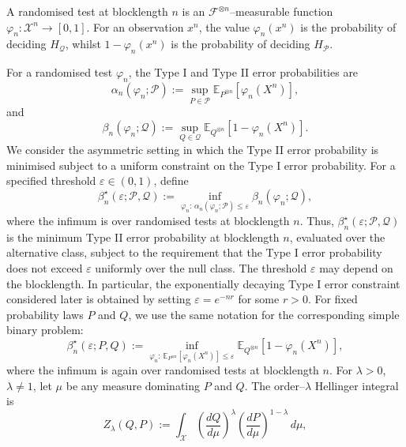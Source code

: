 \documentclass[journal,12pt,draftclsnofoot,onecolumn]{IEEEtran}
\begin{document}
A randomised test at blocklength $n$ is an $\mathcal F^{\otimes n}$--measurable function $\varphi_n:\mathcal X^n\to[0,1]$. For an observation $x^n$, the value $\varphi_n(x^n)$ is the probability of deciding $H_{\mathcal Q}$, whilst $1-\varphi_n(x^n)$ is the probability of deciding $H_{\mathcal P}$.

For a randomised test $\varphi_n$, the Type I and Type II error probabilities are
\begin{equation*}
\alpha_n(\varphi_n;\mathcal P):=\sup_{P\in\mathcal P}\mathbb E_{P^{\otimes n}}\left[\varphi_n(X^n)\right],
\end{equation*}
and
\begin{equation*}
\beta_n(\varphi_n;\mathcal Q):=\sup_{Q\in\mathcal Q}
\mathbb E_{Q^{\otimes n}}\left[1-\varphi_n(X^n)\right].
\end{equation*}
We consider the asymmetric setting in which the Type II error probability is minimised subject to a uniform constraint on the Type I error probability. For a specified threshold $\varepsilon\in(0,1)$, define
\begin{equation}
\beta_n^\star(\varepsilon;\mathcal P,\mathcal Q):=\inf_{\varphi_n:\,\alpha_n(\varphi_n;\mathcal P)\leq\varepsilon} \beta_n(\varphi_n;\mathcal Q),
\label{eq:composite-minimax}
\end{equation}
where the infimum is over randomised tests at blocklength $n$. Thus, $\beta_n^\star(\varepsilon;\mathcal P,\mathcal Q)$ is the minimum Type II error probability at blocklength $n$, evaluated over the alternative class, subject to the requirement that the Type I error probability does not exceed $\varepsilon$ uniformly over the null class. The threshold $\varepsilon$ may depend on the blocklength. In particular, the exponentially decaying Type I error constraint considered later is obtained by setting $\varepsilon=e^{-nr}$ for some $r>0$. For fixed probability laws $P$ and $Q$, we use the same notation for the corresponding simple binary problem:
\begin{equation*}
\beta_n^\star(\varepsilon;P,Q) := \inf_{\varphi_n:\, \mathbb E_{P^{\otimes n}}[\varphi_n(X^n)]\leq\varepsilon} \mathbb E_{Q^{\otimes n}}\left[1-\varphi_n(X^n)\right],
\end{equation*}
where the infimum is again over randomised tests at blocklength $n$. For $\lambda>0$, $\lambda\neq1$, let $\mu$ be any measure dominating $P$ and $Q$. The order--$\lambda$ Hellinger integral is
\begin{equation}
Z_\lambda(Q,P):=\int_{\mathcal X} \left(\frac{dQ}{d\mu}\right)^\lambda \left(\frac{dP}{d\mu}\right)^{1-\lambda} \,d\mu,
\label{eq:hellinger-integral}
\end{equation}
\end{document}
